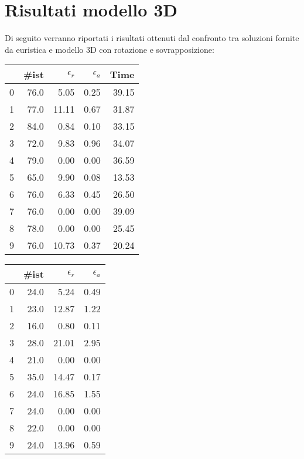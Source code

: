 \section{Risultati modello 3D}
Di seguito verranno riportati i risultati ottenuti dal confronto tra soluzioni fornite da euristica e modello 3D con rotazione e sovrapposizione:
\begin{center}
	\begin{table}[H]
		\begin{minipage}{0.4\textwidth}
			\centering
			\begin{tabular}{lrrrr}
				\toprule
				{} & \#ist & $\epsilon_r$ & $\epsilon_a$ & Time  \\
				\midrule
				0  & 76.0  & 5.05         & 0.25         & 39.15 \\
				1  & 77.0  & 11.11        & 0.67         & 31.87 \\
				2  & 84.0  & 0.84         & 0.10         & 33.15 \\
				3  & 72.0  & 9.83         & 0.96         & 34.07 \\
				4  & 79.0  & 0.00         & 0.00         & 36.59 \\
				5  & 65.0  & 9.90         & 0.08         & 13.53 \\
				6  & 76.0  & 6.33         & 0.45         & 26.50 \\
				7  & 76.0  & 0.00         & 0.00         & 39.09 \\
				8  & 78.0  & 0.00         & 0.00         & 25.45 \\
				9  & 76.0  & 10.73        & 0.37         & 20.24 \\
				\bottomrule
			\end{tabular}
		\end{minipage}
		\begin{minipage}{0.5\textwidth}
			\centering
			\begin{tabular}{lrrr}
				\toprule
				{} & \#ist & $\epsilon_r$ & $\epsilon_a$ \\
				\midrule
				0  & 24.0  & 5.24         & 0.49         \\
				1  & 23.0  & 12.87        & 1.22         \\
				2  & 16.0  & 0.80         & 0.11         \\
				3  & 28.0  & 21.01        & 2.95         \\
				4  & 21.0  & 0.00         & 0.00         \\
				5  & 35.0  & 14.47        & 0.17         \\
				6  & 24.0  & 16.85        & 1.55         \\
				7  & 24.0  & 0.00         & 0.00         \\
				8  & 22.0  & 0.00         & 0.00         \\
				9  & 24.0  & 13.96        & 0.59         \\
				\bottomrule
			\end{tabular}
		\end{minipage}
	\end{table}
\end{center}
